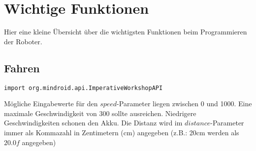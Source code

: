 	

	\section{Wichtige Funktionen}
	Hier eine kleine Übersicht über die wichtigsten Funktionen beim Programmieren der Roboter.
	
	\subsection{Fahren}
		\begin{center}\texttt{import org.mindroid.api.ImperativeWorkshopAPI}\end{center}
		
		Mögliche Eingabewerte für den $speed$-Parameter liegen zwischen 0 und 1000.
		Eine maximale Geschwindigkeit von $300$ sollte ausreichen. Niedrigere Geschwindigkeiten schonen den Akku.	
		Die Distanz wird im $distance$-Parameter immer als Kommazahl in Zentimetern (cm) angegeben (z.B.: 20cm werden als $20.0f$ angegeben)
	
